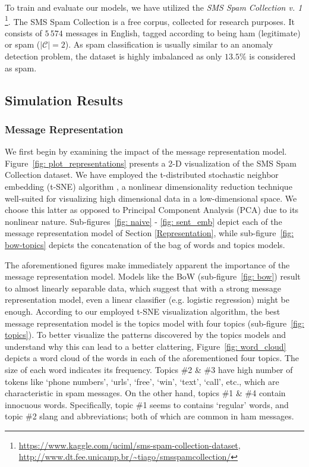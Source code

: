 \documentclass[letterpaper]{article}
\begin{document}
To train and evaluate our models, we have utilized the \emph{SMS Spam Collection v. 1} \footnote{\url{https://www.kaggle.com/uciml/sms-spam-collection-dataset}, \\ \url{http://www.dt.fee.unicamp.br/~tiago/smsspamcollection/}}. The SMS Spam Collection is a free corpus, collected for research purposes. It consists of $5\,574$ messages in English, tagged according to being ham (legitimate) or spam ($|\mathcal{C}| = 2$). As spam classification is usually similar to an anomaly detection problem, the dataset is highly imbalanced as only $13.5\%$ is considered as spam.

\subsection{Simulation Results}  \label{Simulation Results}

\subsubsection{Message Representation}  \label{Representation Results}

We first begin by examining the impact of the message representation model. Figure~\ref{fig: plot_representations} presents a 2-D visualization of the SMS Spam Collection dataset. We have employed the t-distributed stochastic neighbor embedding (t-SNE) algorithm \cite{maaten2008visualizing}, a nonlinear dimensionality reduction technique well-suited for visualizing high dimensional data in a low-dimensional space. We choose this latter as opposed to Principal Component Analysis (PCA) due to its nonlinear nature. Sub-figures~\ref{fig: naive} - \ref{fig: sent_emb} depict each of the message representation model of Section \ref{Representation}, while sub-figure~\ref{fig: bow-topics} depicts the concatenation of the bag of words and topics models.

The aforementioned figures make immediately apparent the importance of the message representation model. Models like the BoW (sub-figure~\ref{fig: bow}) result to almost linearly separable data, which suggest that with a strong message representation model, even a linear classifier (e.g. logistic regression) might be enough. According to our employed t-SNE visualization algorithm, the best message representation model is the topics model with four topics (sub-figure~\ref{fig: topics}). To better visualize the patterns discovered by the topics models and understand why this can lead to a better clattering, Figure~\ref{fig: word_cloud} depicts a word cloud of the words in each of the aforementioned four topics. The size of each word indicates its frequency. Topics \#2 \& \#3 have high number of tokens like `phone numbers', `urls', `free', `win', `text', `call', etc., which are characteristic in spam messages. On the other hand, topics \#1 \& \#4 contain innocuous words. Specifically, topic \#1 seems to contains `regular' words, and topic \#2 slang and abbreviations; both of which are common in ham messages.
\end{document}

